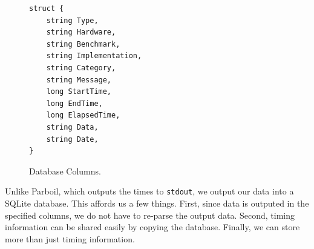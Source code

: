 \begin{figure}[t!]
\begin{verbatim}
struct {
	string Type,
	string Hardware,
	string Benchmark,
	string Implementation,
	string Category,
	string Message,
	long StartTime,
	long EndTime,
	long ElapsedTime,
	string Data,
	string Date,
}
\end{verbatim}
\caption{Database Columns.}
\label{fig:database}
\centering
\end{figure}

Unlike Parboil, which outputs the times to {\tt stdout}, we output our data into
a SQLite database.  This affords us a few things.  First, since data is outputed
in the specified columns, we do not have to re-parse the output data.  Second,
timing information can be shared easily by copying the database.  Finally, we
can store more than just timing information.

